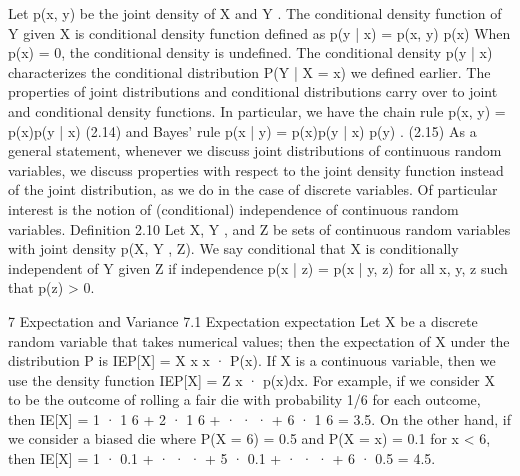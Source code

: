 Let p(x, y) be the joint density of X and Y . The conditional density function of Y given X is conditional density function defined as p(y | x) = p(x, y) p(x) When p(x) = 0, the conditional density is undefined. The conditional density p(y | x) characterizes the conditional distribution P(Y | X = x) we defined earlier. The properties of joint distributions and conditional distributions carry over to joint and conditional density functions. In particular, we have the chain rule p(x, y) = p(x)p(y | x) (2.14) and Bayes’ rule p(x | y) = p(x)p(y | x) p(y) . (2.15) As a general statement, whenever we discuss joint distributions of continuous random variables, we discuss properties with respect to the joint density function instead of the joint distribution, as we do in the case of discrete variables. Of particular interest is the notion of (conditional) independence of continuous random variables. Definition 2.10 Let X, Y , and Z be sets of continuous random variables with joint density p(X, Y , Z). We say conditional that X is conditionally independent of Y given Z if independence p(x | z) = p(x | y, z) for all x, y, z such that p(z) > 0.

7 Expectation and Variance
7.1 Expectation
expectation Let X be a discrete random variable that takes numerical values; then the expectation of X under the distribution P is IEP[X] = X x x · P(x). If X is a continuous variable, then we use the density function IEP[X] = Z x · p(x)dx. For example, if we consider X to be the outcome of rolling a fair die with probability 1/6 for each outcome, then IE[X] = 1 · 1 6 + 2 · 1 6 + · · · + 6 · 1 6 = 3.5. On the other hand, if we consider a biased die where P(X = 6) = 0.5 and P(X = x) = 0.1 for x < 6, then IE[X] = 1 · 0.1 + · · · + 5 · 0.1 + · · · + 6 · 0.5 = 4.5.

